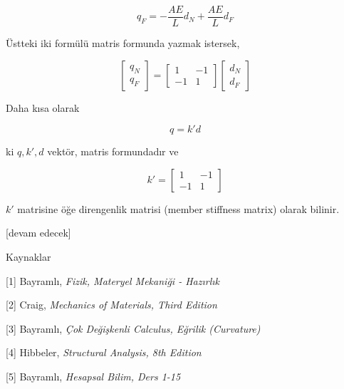 \documentclass[12pt,fleqn]{article}\usepackage{../../common}
\begin{document}
$$
q_F = -\frac{AE}{L} d_N + \frac{AE}{L} d_F
$$

Üstteki iki formülü matris formunda yazmak istersek,

$$
\left[\begin{array}{c}
q_N \\ q_F
\end{array}\right] =
\left[\begin{array}{cc}
1 & -1 \\ -1 & 1
\end{array}\right]
\left[\begin{array}{c}
d_N \\ d_F
\end{array}\right] 
$$

Daha kısa olarak

$$
q = k' d
$$

ki $q,k',d$ vektör, matris formundadır ve

$$
k' = \left[\begin{array}{cc}
1 & -1 \\ -1 & 1
\end{array}\right]
$$

$k'$ matrisine öğe direngenlik matrisi (member stiffness matrix) olarak bilinir.





[devam edecek]

Kaynaklar

[1] Bayramlı, {\em Fizik, Materyel Mekaniği - Hazırlık}

[2] Craig, {\em Mechanics of Materials, Third Edition}

[3] Bayramlı, {\em Çok Değişkenli Calculus, Eğrilik (Curvature)}

[4] Hibbeler, {\em Structural Analysis, 8th Edition}

[5] Bayramlı, {\em Hesapsal Bilim, Ders 1-15}
\end{document}
